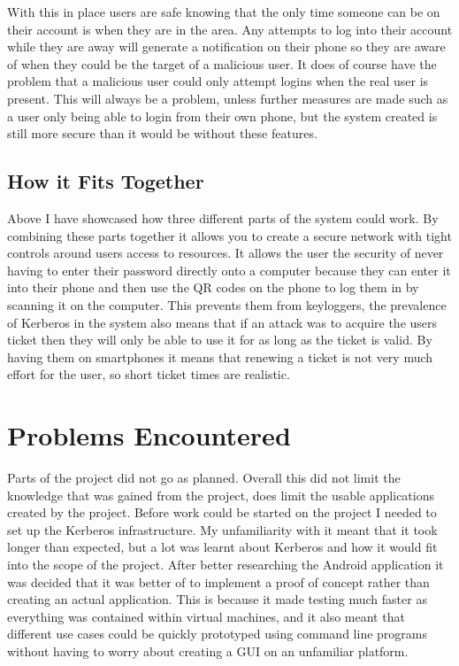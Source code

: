 \documentclass[]{report}   %
\begin{document}
With this in place users are safe knowing that the only time someone can be on their account is when they are in the area. Any attempts to log into their account while they are away will generate a notification on their phone so they are aware of when they could be the target of a malicious user. It does of course have the problem that a malicious user could only attempt logins when the real user is present. This will always be a problem, unless further measures are made such as a user only being able to login from their own phone, but the system created is still more secure than it would be without these features.

\subsection{How it Fits Together}

Above I have showcased how three different parts of the system could work. By combining these parts together it allows you to create a secure network with tight controls around users access to resources. It allows the user the security of never having to enter their password directly onto a computer because they can enter it into their phone and then use the QR codes on the phone to log them in by scanning it on the computer. This prevents them from keyloggers, the prevalence of Kerberos in the system also means that if an attack was to acquire the users ticket then they will only be able to use it for as long as the ticket is valid. By having them on smartphones it means that renewing a ticket is not very much effort for the user, so short ticket times are realistic.



\section{Problems Encountered}
Parts of the project did not go as planned. Overall this did not limit the knowledge that was gained from the project, does limit the usable applications created by the project. Before work could be started on the project I needed to set up the Kerberos infrastructure. My unfamiliarity with it meant that it took longer than expected, but a lot was learnt about Kerberos and how it would fit into the scope of the project. After better researching the Android application it was decided that it was better of to implement a proof of concept rather than creating an actual application. This is because it made testing much faster as everything was contained within virtual machines, and it also meant that different use cases could be quickly prototyped using command line programs without having to worry about creating a GUI on an unfamiliar platform.
\end{document}
